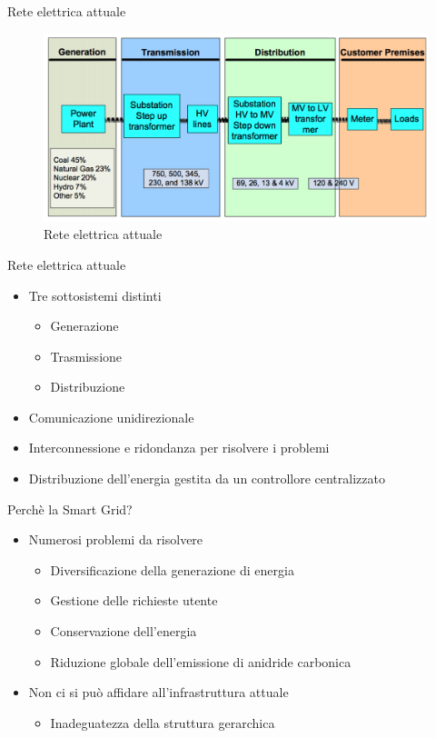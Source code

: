 \begin{frame}{Rete elettrica attuale}
	\begin{figure}[h] 
		\includegraphics[scale=0.25]{imgs/elect_grid.png}
		\caption{Rete elettrica attuale}
	\end{figure}
\end{frame}

\begin{frame}{Rete elettrica attuale}
	\begin{itemize}[<+- | alert@+>]
	\item Tre sottosistemi distinti
		\begin{itemize}
		\item Generazione
		\item Trasmissione
		\item Distribuzione
		\end{itemize}
	\item Comunicazione unidirezionale
	\item Interconnessione e ridondanza per risolvere i problemi
	\item Distribuzione dell'energia gestita da un controllore centralizzato
	\end{itemize}
\end{frame}

\begin{frame}{Perchè la Smart Grid?}
	\begin{itemize}[<+- | alert@+>]
	\item Numerosi problemi da risolvere
		\begin{itemize}
		\item Diversificazione della generazione di energia
		\item Gestione delle richieste utente
		\item Conservazione dell’energia
		\item Riduzione globale dell’emissione di anidride carbonica
		\end{itemize}
	\item Non ci si può affidare all'infrastruttura attuale
		\begin{itemize}
			\item Inadeguatezza della struttura gerarchica
		\end{itemize}
	\end{itemize}
\end{frame}

